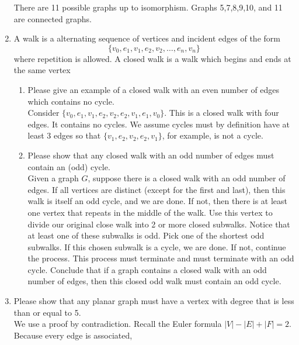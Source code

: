 \documentclass[a4paper]{article}
\begin{document}
\begin{enumerate}
	There are 11 possible graphs up to isomorphism.
	Graphs 5,7,8,9,10, and 11 are connected graphs.


\newpage
\item

A walk is a alternating sequence of vertices and incident edges of the form
$$
\{v_0, e_1, v_1, e_2, v_2, \dots , e_n, v_n \}
$$
where repetition is allowed. A closed walk is a walk which begins and ends at the same vertex

\begin{enumerate}
	\item
	Please give an example of a closed walk with an even number of edges
	which contains no cycle. \\
	
	Consider $\{v_0 , e_1, v_1, e_2, v_2, e_2, v_1, e_1, v_0\}$. This
	is a closed walk with four edges. It contains no cycles. We assume
	cycles must by definition have at least 3 edges so that $\{v_1, e_2,
	v_2, e_2, v_1 \}$, for example, is not a cycle. 
	
	\item
	Please show that any closed walk with an odd number of edges must
	contain an (odd) cycle. \\
	
	Given a graph $G$, suppose there is a closed walk with an odd number of edges. If all vertices are distinct (except for the first and last), then this walk is itself an odd cycle, and we are done. If not, then there is at least one vertex that repeats in the middle of the walk. Use this vertex to divide our original close walk into 2 or more closed subwalks. Notice that at least one of these subwalks is odd. Pick one of the shortest odd subwalks. If this chosen subwalk is a cycle, we are done. If not, continue the process. This process must terminate and must terminate with an odd cycle. Conclude that if a graph contains a closed walk with an odd number of edges, then this closed odd walk must contain an odd cycle. 
	
\end{enumerate}


\newpage
\item

Please show that any planar graph must have a vertex with degree that is less than or equal to 5. \\

We use a proof by contradiction. Recall the Euler formula $|V| - |E| + |F| = 2$. Because every edge is associated,


\end{enumerate}
\end{document}
